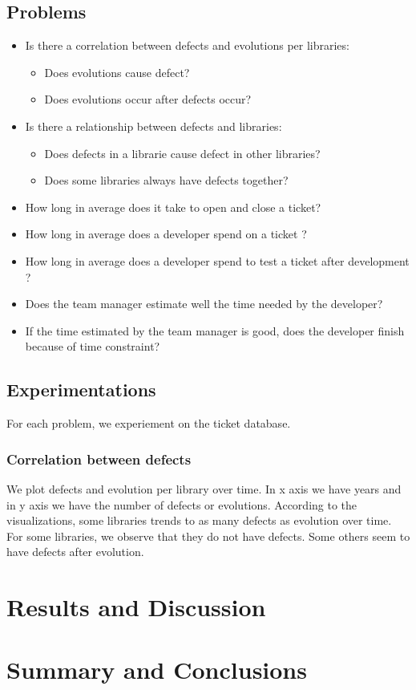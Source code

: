 \documentclass[10pt,conference]{IEEEtran}
\begin{document}
 \subsection{Problems}
 \begin{itemize}
 \item  Is  there a correlation between defects and evolutions per libraries:
 \begin{itemize}
 \item Does evolutions cause defect?
 \item  Does evolutions occur after defects occur?
 \end{itemize}
 \item Is there a relationship between defects  and libraries:
 \begin{itemize}
 \item Does defects in a librarie cause defect in other libraries?
 \item Does some libraries always have defects together?
 \end{itemize}
 \item How long in average does it take to open and close a ticket?
 \item How long in average  does a developer spend on a ticket ?
 \item How long in average does a developer spend to test a ticket after development ?
 \item Does the team manager estimate well  the time needed by the developer?
 \item If the time estimated by the team manager is good, does the developer finish because  of time constraint?
 \end{itemize}
 
 \subsection{Experimentations}
For each problem, we experiement on the ticket database. 
 \subsubsection{Correlation between defects }
We plot  defects and evolution per library over time.  In x axis we have years and in y axis  we have the number of defects  or evolutions.  According to  the visualizations, some libraries trends to as many defects as  evolution over time. For some libraries, we observe that they do not have defects. Some others seem to  have defects after evolution. 
 \section{Results and Discussion}\label{sec:results-discussion}


  
\section{Summary and Conclusions}\label{sec:conclusion}

%



\vspace{12pt}
\end{document}
